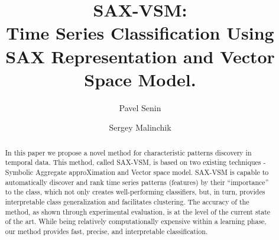 \documentclass{llncs}
\begin{document}
%
\mainmatter              %
%
\title{SAX-VSM: \\Time Series Classification Using SAX Representation and Vector Space Model.}
%
%
\author{Pavel Senin
\and Sergey Malinchik
}
%
%
%


\maketitle              %

\begin{abstract}
In this paper we propose a novel method for characteristic patterns discovery in 
temporal data. This method, called SAX-VSM, is based on two existing techniques - 
Symbolic Aggregate approXimation and Vector space model. SAX-VSM is capable 
to automatically discover and rank time series patterns (features) by their 
“importance” to the class, which not only creates well-performing classifiers, 
but, in turn, provides interpretable class generalization and facilitates clustering. 
The accuracy of the method, as shown through experimental evaluation, is at the 
level of the current state of the art. 
While being relatively computationally expensive within a learning phase, 
our method provides fast, precise, and interpretable classification.
\end{abstract}
%
\end{document}
